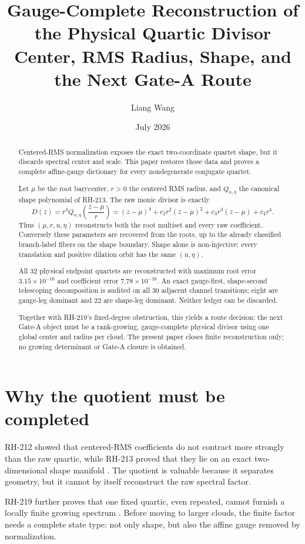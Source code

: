 \documentclass[12pt]{article}
\title{Gauge-Complete Reconstruction of the Physical Quartic Divisor\\
\large Center, RMS Radius, Shape, and the Next Gate-A Route}
\author{Liang Wang}\date{July 2026}
\theoremstyle{remark}\newtheorem{remark}[theorem]{Remark}
\begin{document}
\maketitle
\begin{abstract}
Centered-RMS normalization exposes the exact two-coordinate quartet shape,
but it discards spectral center and scale.  This paper restores those data
and proves a complete affine-gauge dictionary for every nondegenerate
conjugate quartet.

Let $\mu$ be the root barycenter, $r>0$ the centered RMS radius, and
$Q_{u,\eta}$ the canonical shape polynomial of RH-213.  The raw monic divisor
is exactly
\[
 D(z)=r^4Q_{u,\eta}\!\left(\frac{z-\mu}{r}\right)
 =(z-\mu)^4+c_2r^2(z-\mu)^2+c_3r^3(z-\mu)+c_4r^4.
\]
Thus $(\mu,r,u,\eta)$ reconstructs both the root multiset and every raw
coefficient.  Conversely these parameters are recovered from the roots,
up to the already classified branch-label fibers on the shape boundary.
Shape alone is non-injective: every translation and positive dilation orbit
has the same $(u,\eta)$.

All 32 physical endpoint quartets are reconstructed with maximum root error
$3.15\times10^{-16}$ and coefficient error $7.78\times10^{-16}$.  An exact
gauge-first, shape-second telescoping decomposition is audited on all 30
adjacent channel transitions; eight are gauge-leg dominant and 22 are
shape-leg dominant.  Neither ledger can be discarded.

Together with RH-219's fixed-degree obstruction, this yields a route
decision: the next Gate-A object must be a rank-growing, gauge-complete
physical divisor using one global center and radius per cloud.  The present
paper closes finite reconstruction only; no growing determinant or Gate-A
closure is obtained.
\end{abstract}

\section{Why the quotient must be completed}

RH-212 showed that centered-RMS coefficients do not contract more strongly
than the raw quartic, while RH-213 proved that they lie on an exact
two-dimensional shape manifold \citep{WangRH212,WangRH213}.  The quotient is
valuable because it separates geometry, but it cannot by itself reconstruct
the raw spectral factor.

RH-219 further proves that one fixed quartic, even repeated, cannot furnish a
locally finite growing spectrum \citep{WangRH219}.  Before moving to larger
clouds, the finite factor needs a complete state type: not only shape, but
also the affine gauge removed by normalization.
\end{document}
